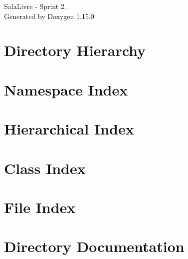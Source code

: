 \documentclass[twoside]{book}
\newcommand{\+}{\discretionary{\mbox{\scriptsize$\hookleftarrow$}}{}{}}
\newcommand{\clearemptydoublepage}{%
    \newpage{\pagestyle{empty}\cleardoublepage}%
  }
\begin{document}
  \raggedbottom
    \hypersetup{pageanchor=false,
                bookmarksnumbered=true,
                pdfencoding=unicode
               }
  \begin{titlepage}
  \vspace*{7cm}
  \begin{center}%
  {\Large Sala\+Livre -\/ Sprint 2.}\\
  \vspace*{1cm}
  {\large Generated by Doxygen 1.15.0}\\
  \end{center}
  \end{titlepage}
  \clearemptydoublepage
  \tableofcontents
  \clearemptydoublepage
  \hypersetup{pageanchor=true}
\chapter{Directory Hierarchy}

\chapter{Namespace Index}

\chapter{Hierarchical Index}

\chapter{Class Index}

\chapter{File Index}

\chapter{Directory Documentation}













\end{document}
